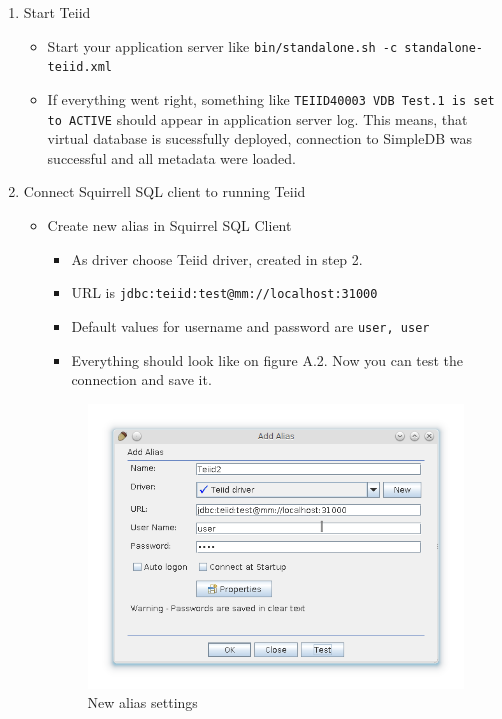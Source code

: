 \documentclass[oneside,12pt,final]{fithesis2}
\begin{document}
\begin{enumerate}
\begin{enumerate}
\begin{itemize}
 \end{itemize}
\item Start Teiid
\begin{itemize}
 \item Start your application server like \texttt{bin/standalone.sh -c standalone-teiid.xml}
 \item If everything went right, something like \texttt{TEIID40003 VDB Test.1 is set to ACTIVE} should appear in application server log. This means, that virtual database is sucessfully deployed, connection to SimpleDB was successful and all metadata were loaded.
\end{itemize}
\item Connect Squirrell SQL client to running Teiid
\begin{itemize}
 \item Create new alias in Squirrel SQL Client
 \begin{itemize}
  \item As driver choose Teiid driver, created in step 2.
  \item URL is \texttt{jdbc:teiid:test@mm://localhost:31000}
  \item Default values for username and password are \texttt{user, user}
  \item Everything should look like on figure A.2. Now you can test the connection and save it. 
 \end{itemize}
 \begin{figure}[h]
 \centering
 \includegraphics[scale=0.8]{newAlias}
 \caption{New alias settings}
 \end{figure}
\end{itemize}

\end{enumerate}
\end{enumerate}
\end{document}
